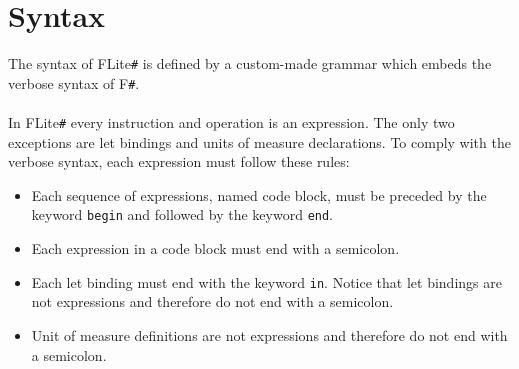 \documentclass[]{article}
\begin{document}
	\section{Syntax}
	\label{sec:syntax}
		The syntax of FLite\verb|#| is defined by a custom-made grammar which embeds the verbose syntax of F\verb|#|.\\\\
		In FLite\verb|#| every instruction and operation is an expression. The only two exceptions are let bindings and units of measure declarations. To comply with the verbose syntax, each expression must follow these rules:
		\begin{itemize}
			\item Each sequence of expressions, named code block, must be preceded by the keyword \lstinline|begin| and followed by the keyword \lstinline|end|.
			\item Each expression in a code block must end with a semicolon.
			\item Each let binding must end with the keyword \lstinline|in|. Notice that let bindings are not expressions and therefore do not end with a semicolon.
			\item Unit of measure definitions are not expressions and therefore do not end with a semicolon.
		\end{itemize}
\end{document}
